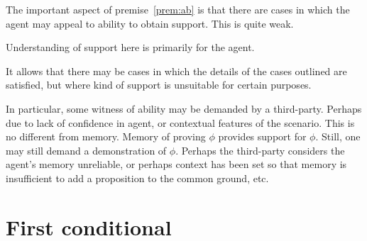 \begin{note}
  The important aspect of premise~\ref{prem:ab} is that there are cases in which the agent may appeal to ability to obtain support.
  This is quite weak.

  Understanding of support here is primarily for the agent.

  It allows that there may be cases in which the details of the cases outlined are satisfied, but where kind of support is unsuitable for certain purposes.

  In particular, some witness of ability may be demanded by a third-party.
  Perhaps due to lack of confidence in agent, or contextual features of the scenario.
  This is no different from memory.
  Memory of proving \(\phi\) provides support for \(\phi\).
  Still, one may still demand a demonstration of \(\phi\).
  Perhaps the third-party considers the agent's memory unreliable, or perhaps context has been set so that memory is insufficient to add a proposition to the common ground, etc.
\end{note}

\section{First conditional}
\label{sec:first-conditional}

